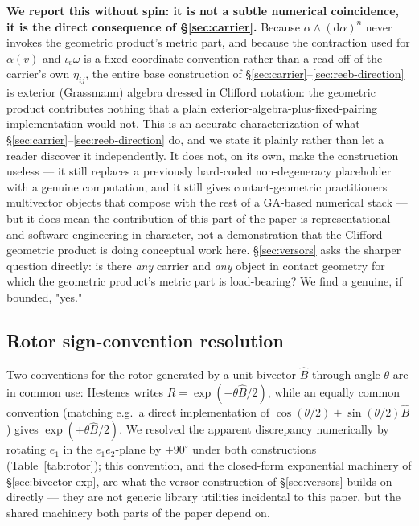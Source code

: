 \documentclass[11pt]{article}
\newcommand{\dif}{\mathrm{d}}
\begin{document}
\textbf{We report this without spin: it is not a subtle numerical coincidence, it is the direct consequence of \S\ref{sec:carrier}.} Because $\alpha\wedge(\dif\alpha)^n$ never invokes the geometric product's metric part, and because the contraction used for $\alpha(v)$ and $\iota_v\omega$ is a fixed coordinate convention rather than a read-off of the carrier's own $\eta_{ij}$, the entire base construction of \S\ref{sec:carrier}--\ref{sec:reeb-direction} is exterior (Grassmann) algebra dressed in Clifford notation: the geometric product contributes nothing that a plain exterior-algebra-plus-fixed-pairing implementation would not. This is an accurate characterization of what \S\ref{sec:carrier}--\ref{sec:reeb-direction} do, and we state it plainly rather than let a reader discover it independently. It does not, on its own, make the construction useless — it still replaces a previously hard-coded non-degeneracy placeholder with a genuine computation, and it still gives contact-geometric practitioners multivector objects that compose with the rest of a GA-based numerical stack — but it does mean the contribution of this part of the paper is representational and software-engineering in character, not a demonstration that the Clifford geometric product is doing conceptual work here. \S\ref{sec:versors} asks the sharper question directly: is there \emph{any} carrier and \emph{any} object in contact geometry for which the geometric product's metric part is load-bearing? We find a genuine, if bounded, "yes."

\subsection{Rotor sign-convention resolution}
\label{sec:rotor-convention}

Two conventions for the rotor generated by a unit bivector $\hat B$ through angle $\theta$ are in common use: Hestenes writes $R=\exp(-\theta \hat B/2)$, while an equally common convention (matching e.g.\ a direct implementation of $\cos(\theta/2)+\sin(\theta/2)\hat B$) gives $\exp(+\theta\hat B/2)$. We resolved the apparent discrepancy numerically by rotating $e_1$ in the $e_1e_2$-plane by $+90^\circ$ under both constructions (Table~\ref{tab:rotor}); this convention, and the closed-form exponential machinery of \S\ref{sec:bivector-exp}, are what the versor construction of \S\ref{sec:versors} builds on directly — they are not generic library utilities incidental to this paper, but the shared machinery both parts of the paper depend on.
\end{document}
